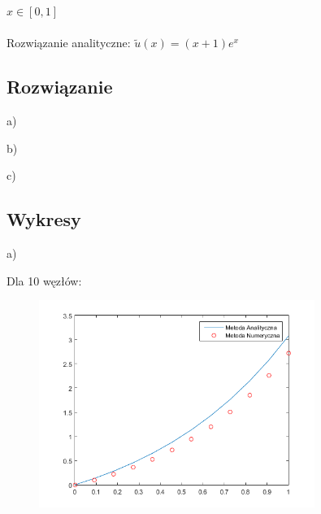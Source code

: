 $x\in [0,1]$
\\
\\
Rozwiązanie analityczne: $\widetilde{u}(x) = (x+1)e^x$

\subsection{Rozwiązanie}


\begin{samepage}
a)

\end{samepage}
\newpage
\begin{samepage}
b)

\end{samepage}
\newpage
\begin{samepage}
c)

\end{samepage}

\newpage

\subsection{Wykresy}

a)\\
\begin{samepage}
	Dla 10 węzłów:
	
	
	
	\FloatBarrier
	\begin{figure}[!ht]
		\begin{center}
			\includegraphics[width=0.8\textwidth]{Lab4/charts/zad4/1/10.png}
		\end{center}
	\end{figure}
	\FloatBarrier
\end{samepage}

